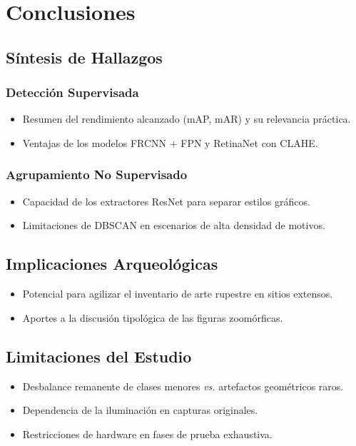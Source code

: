 \chapter{Conclusiones}\label{ch:conclusiones}

\section{Síntesis de Hallazgos}

\subsection{Detección Supervisada}
\begin{itemize}
  \item Resumen del rendimiento alcanzado (mAP, mAR) y su relevancia práctica.  
  \item Ventajas de los modelos FRCNN + FPN y RetinaNet con CLAHE.  
\end{itemize}

\subsection{Agrupamiento No Supervisado}
\begin{itemize}
  \item Capacidad de los extractores ResNet para separar estilos gráficos.  
  \item Limitaciones de DBSCAN en escenarios de alta densidad de motivos.  
\end{itemize}

\section{Implicaciones Arqueológicas}
\begin{itemize}
  \item Potencial para agilizar el inventario de arte rupestre en sitios extensos.  
  \item Aportes a la discusión tipológica de las figuras zoomórficas.  
\end{itemize}

\section{Limitaciones del Estudio}
\begin{itemize}
  \item Desbalance remanente de clases menores \textit{vs.} artefactos geométricos raros.  
  \item Dependencia de la iluminación en capturas originales.  
  \item Restricciones de hardware en fases de prueba exhaustiva.  
\end{itemize}

